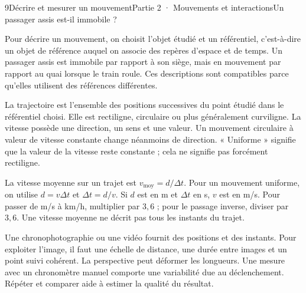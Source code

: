 \begin{ouverture}[college2]{9}{Décrire et mesurer un mouvement}{Partie 2 · Mouvements et interactions}{Un passager assis est-il immobile ?}
\end{ouverture}
\label{ess-9}
Pour décrire un mouvement, on choisit l’objet étudié et un référentiel, c’est-à-dire un objet de référence auquel on associe des repères d’espace et de temps. Un passager assis est immobile par rapport à son siège, mais en mouvement par rapport au quai lorsque le train roule. Ces descriptions sont compatibles parce qu’elles utilisent des références différentes.\par
{}
La trajectoire est l’ensemble des positions successives du point étudié dans le référentiel choisi. Elle est rectiligne, circulaire ou plus généralement curviligne. La vitesse possède une direction, un sens et une valeur. Un mouvement circulaire à valeur de vitesse constante change néanmoins de direction. « Uniforme » signifie que la valeur de la vitesse reste constante ; cela ne signifie pas forcément rectiligne.\par
\clearpage
{}
La vitesse moyenne sur un trajet est $v_{\mathrm{moy}}=d/\Delta t$. Pour un mouvement uniforme, on utilise $d=v\Delta t$ et $\Delta t=d/v$. Si $d$ est en m et $\Delta t$ en s, $v$ est en m/s. Pour passer de m/s à km/h, multiplier par $3{,}6$ ; pour le passage inverse, diviser par $3{,}6$. Une vitesse moyenne ne décrit pas tous les instants du trajet.\par
{}
Une chronophotographie ou une vidéo fournit des positions et des instants. Pour exploiter l’image, il faut une échelle de distance, une durée entre images et un point suivi cohérent. La perspective peut déformer les longueurs. Une mesure avec un chronomètre manuel comporte une variabilité due au déclenchement. Répéter et comparer aide à estimer la qualité du résultat.\par
